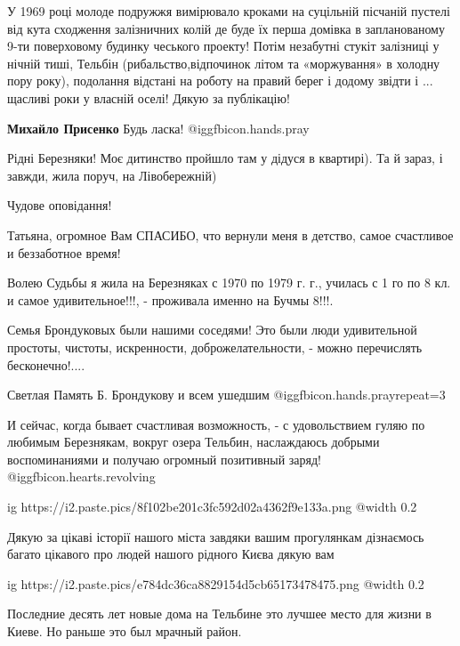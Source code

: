 \begin{itemize}
У 1969 році молоде подружжя вимірювало кроками на суцільній пісчаній пустелі
від кута сходження залізничних колій де буде їх перша домівка в запланованому
9-ти поверховому будинку чеського проекту! Потім незабутні стукіт залізниці у
нічній тиші, Тельбін (рибальство,відпочинок літом та «моржування» в холодну
пору року), подолання відстані на роботу на правий берег і додому звідти і ...
щасливі роки у власній оселі! Дякую за публікацію!

\textbf{Михайло Присенко} Будь ласка! @igg{fbicon.hands.pray} 


Рідні Березняки! Моє дитинство пройшло там у дідуся в квартирі). Та й зараз, і
завжди, жила поруч, на Лівобережній)

Чудове оповідання!


Татьяна, огромное Вам СПАСИБО, что вернули меня в детство, самое счастливое и
беззаботное время!

Волею Судьбы я жила на Березняках с 1970 по 1979 г. г., училась с 1 го по 8 кл. и
самое удивительное!!!, - проживала именно на Бучмы 8!!!.

Семья Брондуковых были нашими соседями! Это были люди удивительной
простоты, чистоты, искренности, доброжелательности, - можно перечислять
бесконечно!....

Светлая Память Б. Брондукову и всем ушедшим @igg{fbicon.hands.pray}{repeat=3} 

И сейчас, когда бывает счастливая возможность, - с удовольствием гуляю по любимым
Березнякам, вокруг озера Тельбин, наслаждаюсь добрыми воспоминаниями и получаю
огромный позитивный заряд! @igg{fbicon.hearts.revolving} 

\ifcmt
  ig https://i2.paste.pics/8f102be201c3fc592d02a4362f9e133a.png
  @width 0.2
\fi


Дякую за цікаві історії нашого міста завдяки вашим прогулянкам дізнаємось
багато цікавого про людей нашого рідного Києва дякую вам


\ifcmt
  ig https://i2.paste.pics/e784dc36ca8829154d5cb65173478475.png
  @width 0.2
\fi


Последние десять лет новые дома на Тельбине это лучшее место для жизни в Киеве.
Но раньше это был мрачный район.


\end{itemize}
